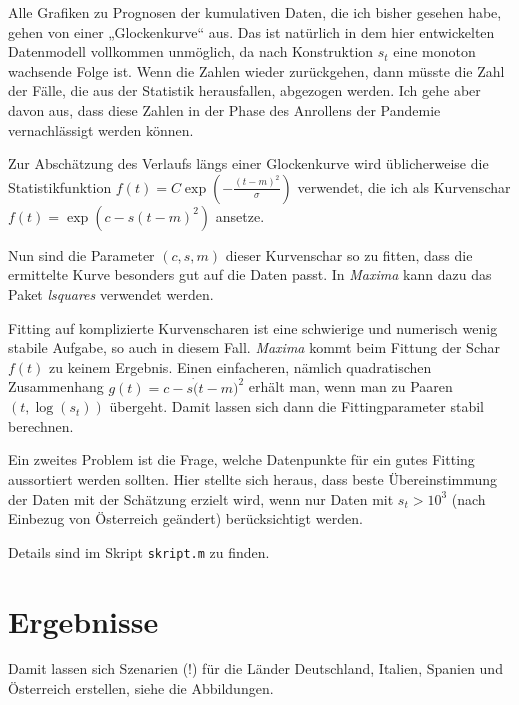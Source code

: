 \documentclass[a4paper,11pt]{article}
\begin{document}
Alle Grafiken zu Prognosen der kumulativen Daten, die ich bisher gesehen habe,
gehen von einer „Glockenkurve“ aus.  Das ist natürlich in dem hier
entwickelten Datenmodell vollkommen unmöglich, da nach Konstruktion $s_t$ eine
monoton wachsende Folge ist. Wenn die Zahlen wieder zurückgehen, dann müsste
die Zahl der Fälle, die aus der Statistik herausfallen, abgezogen werden.  Ich
gehe aber davon aus, dass diese Zahlen in der Phase des Anrollens der Pandemie
vernachlässigt werden können.

Zur Abschätzung des Verlaufs längs einer Glockenkurve wird üblicherweise die
Statistikfunktion $f(t)=C\exp\left(-\frac{(t-m)^2}{\sigma}\right)$ verwendet,
die ich als Kurvenschar $f(t)=\exp\left(c-s(t-m)^2\right)$ ansetze.

Nun sind die Parameter $(c,s,m)$ dieser Kurvenschar so zu fitten, dass die
ermittelte Kurve besonders gut auf die Daten passt.  In \emph{Maxima} kann
dazu das Paket \emph{lsquares} verwendet werden.

Fitting auf komplizierte Kurvenscharen ist eine schwierige und numerisch wenig
stabile Aufgabe, so auch in diesem Fall. \emph{Maxima} kommt beim Fittung der
Schar $f(t)$ zu keinem Ergebnis.  Einen einfacheren, nämlich quadratischen
Zusammenhang $g(t)=c-s\dot(t-m)^2$ erhält man, wenn man zu Paaren
$(t,\log(s_t))$ übergeht.  Damit lassen sich dann die Fittingparameter stabil
berechnen.

Ein zweites Problem ist die Frage, welche Datenpunkte für ein gutes Fitting
aussortiert werden sollten.  Hier stellte sich heraus, dass beste
Übereinstimmung der Daten mit der Schätzung erzielt wird, wenn nur Daten mit
$s_t>10^3$ (nach Einbezug von Österreich geändert) berücksichtigt werden.

Details sind im Skript \texttt{skript.m} zu finden.

\section{Ergebnisse}

Damit lassen sich Szenarien (!) für die Länder Deutschland, Italien, Spanien
und Österreich erstellen, siehe die Abbildungen.
\end{document}
